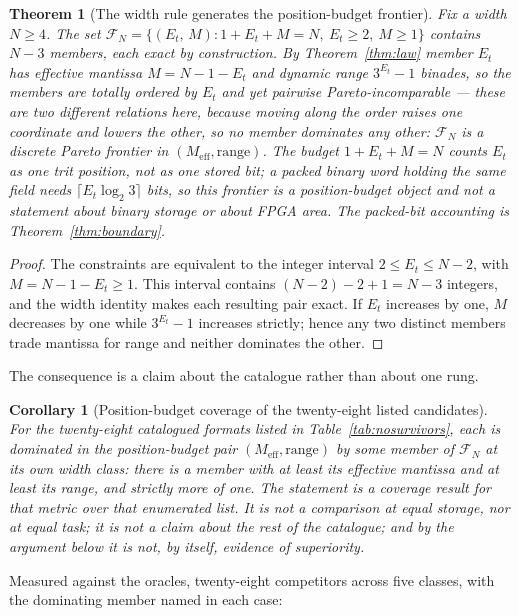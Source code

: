 \documentclass[11pt]{article}
\newtheorem{theorem}{Theorem}
\newtheorem{corollary}{Corollary}
\theoremstyle{definition}
\begin{document}
\begin{theorem}[The width rule generates the position-budget frontier]
\label{thm:family}
Fix a width $N\geq4$. The set
$\mathcal{F}_N = \{(E_t,\, M) : 1 + E_t + M = N,\ E_t \geq 2,\ M \geq 1\}$
contains $N-3$ members, each exact by construction. By
Theorem~\ref{thm:law} member $E_t$ has effective mantissa $M = N-1-E_t$ and
dynamic range $3^{E_t}-1$ binades, so the members are totally ordered by $E_t$ and
yet pairwise Pareto-incomparable --- these are two different relations here, because
moving along the order raises one coordinate and lowers the other, so no member
dominates any other: $\mathcal{F}_N$ is a discrete Pareto frontier in
$(M_{\mathrm{eff}}, \text{range})$. The budget $1+E_t+M=N$ counts $E_t$ as one
\emph{trit position}, not as one stored bit; a packed binary word holding the
same field needs $\lceil E_t\log_2 3\rceil$ bits, so this frontier is a
position-budget object and not a statement about binary storage or about FPGA
area. The packed-bit accounting is Theorem~\ref{thm:boundary}.
\end{theorem}
\begin{proof}
The constraints are equivalent to the integer interval
$2\leq E_t\leq N-2$, with $M=N-1-E_t\geq1$. This interval contains
$(N-2)-2+1=N-3$ integers, and the width identity makes each resulting pair
exact. If $E_t$ increases by one, $M$ decreases by one while
$3^{E_t}-1$ increases strictly; hence any two distinct members trade mantissa
for range and neither dominates the other.
\end{proof}

The consequence is a claim about the catalogue rather than about one rung.

\sloppy
\begin{corollary}[Position-budget coverage of the twenty-eight listed
candidates]
\label{cor:nosurvivors}
For the twenty-eight catalogued formats listed in
Table~\ref{tab:nosurvivors}, each is dominated in the position-budget pair
$(M_{\mathrm{eff}}, \text{range})$ by some member of $\mathcal{F}_N$ at its own
width class: there is a member with at least its effective mantissa and at least
its range, and strictly more of one. The statement is a coverage result for that
metric over that enumerated list. It is not a comparison at equal storage, nor
at equal task; it is not a claim about the rest of the catalogue; and by the
argument below it is not, by itself, evidence of superiority.
\end{corollary}
\fussy

Measured against the oracles, twenty-eight competitors across five classes, with
the dominating member named in each case:
\end{document}
